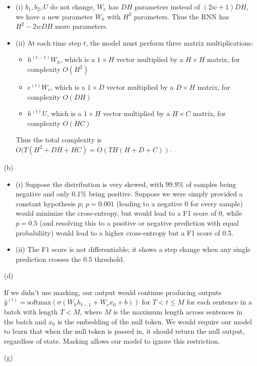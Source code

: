 \documentclass{article}
\begin{document}
\begin{itemize}
\item (i) $b_1, b_2, U$ do not change, $W_e$ has $DH$ parameters instead of $(2w + 1)DH$, we have a new parameter $W_h$ with $H^2$ parameters. Thus the RNN has $H^2 - 2wDH$ more parameters.
\item (ii) At each time step $t$, the model must perform three matrix multiplications:
\begin{itemize}
\item $h^{(t-1)}W_h$, which is a $1 \times H$ vector multiplied by a $H \times H$ matrix, for complexity $O(H^2)$
\item $e^{(t)}W_e$, which is a $1 \times D$ vector multiplied by a $D \times H$ matrix, for complexity $O(DH)$
\item $h^{(t)}U$, which is a $1 \times H$ vector multiplied by a $H \times C$ matrix, for complexity $O(HC)$
\end{itemize}
Thus the total complexity is $O(T(H^2 + DH + HC) = O(TH(H + D + C))$.
\end{itemize}

(b)

\begin{itemize}
\item (i) Suppose the distribution is very skewed, with 99.9\% of samples being negative and only 0.1\% being positive. Suppose we were simply provided a constant hypothesis $p$; $p=0.001$ (leading to a negative 0 for every sample) would minimize the cross-entropy, but would lead to a F1 score of 0, while $p=0.5$ (and resolving this to a positive or negative prediction with equal probabiliity) would lead to a higher cross-entropy but a F1 score of 0.5.
\item (ii) The F1 score is not differentiable; it shows a step change when any single prediction crosses the 0.5 threshold.
\end{itemize}

(d)

If we didn't use masking, our output would continue producing outputs $\hat{y}^{(t)} = \text{softmax}(\sigma(W_h h_{t-1} + W_e x_0 + b))$ for $T < t \le M$ for each sentence in a batch with length $T < M$, where $M$ is the maximum length across sentences in the batch and $x_0$ is the embedding of the null token. We would require our model to learn that when the null token is passed in, it should return the null output, regardless of state. Masking allows our model to ignore this restriction.

(g)
\end{document}
